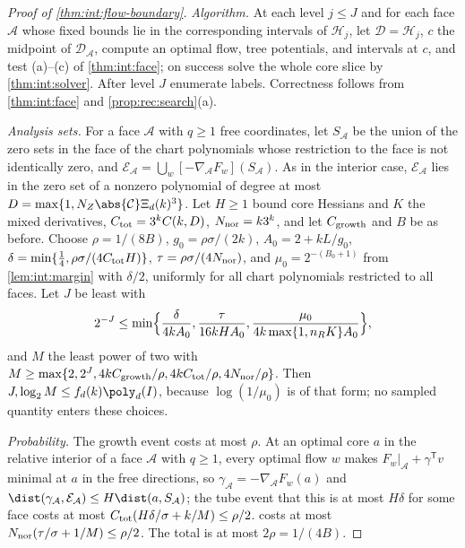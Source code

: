 \begin{proof}[Proof of \cref{thm:int:flow-boundary}]
\emph{Algorithm.} At each level $j\le J$ and for each face $\mathcal A$ whose fixed
bounds lie in the corresponding intervals of $\mathcal H_j$, let $\mathcal D=\mathcal H_j$,
$c$ the midpoint of $\mathcal D_{\mathcal A}$, compute an optimal flow, tree potentials,
and intervals at $c$, and test (a)--(c) of \cref{thm:int:face}; on success solve the
whole core slice by \cref{thm:int:solver}. After level $J$ enumerate labels. Correctness
follows from \cref{thm:int:face} and \cref{prop:rec:search}(a).

\emph{Analysis sets.} For a face $\mathcal A$ with $q\ge1$ free coordinates, let
$S_{\mathcal A}$ be the union of the zero sets in the face of the chart polynomials whose
restriction to the face is not identically zero, and
$\mathcal E_{\mathcal A}=\bigcup_w[-\nabla_{\mathcal A}F_w](S_{\mathcal A})$. As in the
interior case, $\mathcal E_{\mathcal A}$ lies in the zero set of a nonzero polynomial of
degree at most $D=\max\{1,N_Z\abs{\mathcal C}\Xi_d(k)^3\}$. Let $H\ge1$ bound core
Hessians and $K$ the mixed derivatives, $C_{\rm tot}=3^kC(k,D)$,
$N_{\rm nor}=k3^k$, and let $C_{\rm growth}$ and $B$ be as before. Choose
$\rho=1/(8B)$, $g_0=\rho\sigma/(2k)$, $A_0=2+kL/g_0$,
$\delta=\min\{\frac14,\rho\sigma/(4C_{\rm tot}H)\}$, $\tau=\rho\sigma/(4N_{\rm nor})$, and
$\mu_0=2^{-(B_0+1)}$ from \cref{lem:int:margin} with $\delta/2$, uniformly for all chart
polynomials restricted to all faces. Let $J$ be least with
\[
 2^{-J}\le\min\Bigl\{\frac\delta{4kA_0},\frac\tau{16kHA_0},
 \frac{\mu_0}{4k\max\{1,n_RK\}A_0}\Bigr\},
\]
and $M$ the least power of two with $M\ge\max\{2,2^J,4kC_{\rm growth}/\rho,
4kC_{\rm tot}/\rho,4N_{\rm nor}/\rho\}$. Then $J,\log_2M\le f_d(k)\poly_d(I)$, because
$\log(1/\mu_0)$ is of that form; no sampled quantity enters these choices.

\emph{Probability.} The growth event costs at most $\rho$. At an optimal core $a$ in
the relative interior of a face $\mathcal A$ with $q\ge1$, every optimal flow $w$ makes
$F_w|_{\mathcal A}+\gamma^{\mathsf T}v$ minimal at $a$ in the free directions, so
$\gamma_{\mathcal A}=-\nabla_{\mathcal A}F_w(a)$ and
$\dist(\gamma_{\mathcal A},\mathcal E_{\mathcal A})\le H\dist(a,S_{\mathcal A})$; the tube
event that this is at most $H\delta$ for some face costs at most
$C_{\rm tot}(H\delta/\sigma+k/M)\le\rho/2$.  costs at most
$N_{\rm nor}(\tau/\sigma+1/M)\le\rho/2$. The total is at most $2\rho=1/(4B)$.


\end{proof}
